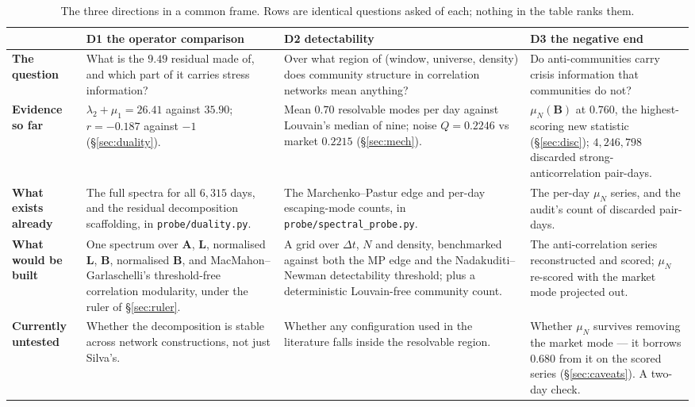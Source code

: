 \documentclass[11pt,a4paper]{article}
\newcommand{\Q}{Q}
\newcommand{\Lap}{\mathbf{L}}
\newcommand{\Amat}{\mathbf{A}}
\newcommand{\Bmat}{\mathbf{B}}
\begin{document}
\begin{table}[t]
\centering\small
\caption{The three directions in a common frame. Rows are identical questions
asked of each; nothing in the table ranks them.}
\label{tab:directions}
\renewcommand{\arraystretch}{1.12}
\begin{tabular}{@{}p{22mm}p{40mm}p{40mm}p{40mm}@{}}
\toprule
& \textbf{\textcolor{ModC}{D1}} the operator comparison
& \textbf{\textcolor{ModC}{D2}} detectability
& \textbf{\textcolor{ModC}{D3}} the negative end \\
\midrule

\textbf{The question}
& What is the $9.49$ residual made of, and which part of it carries stress
information?
& Over what region of (window, universe, density) does community structure in
correlation networks mean anything?
& Do anti-communities carry crisis information that communities do not? \\

\textbf{Evidence so far}
& $\lambda_2+\mu_1=26.41$ against $35.90$; $r=-0.187$ against $-1$
  (\S\ref{sec:duality}).
& Mean $0.70$ resolvable modes per day against Louvain's median of nine; noise
  $\Q=0.2246$ vs market $0.2215$ (\S\ref{sec:mech}).
& $\mu_N(\Bmat)$ at $0.760$, the highest-scoring new statistic
  (\S\ref{sec:disc}); $4{,}246{,}798$ discarded strong-anticorrelation
  pair-days. \\

\textbf{What exists already}
& The full spectra for all $6{,}315$ days, and the residual decomposition
  scaffolding, in \texttt{probe/duality.py}.
& The Marchenko--Pastur edge and per-day escaping-mode counts, in
  \texttt{probe/}\linebreak\texttt{spectral\_probe.py}.
& The per-day $\mu_N$ series, and the audit's count of discarded pair-days. \\

\textbf{What would be built}
& One spectrum over $\Amat$, $\Lap$, normalised $\Lap$, $\Bmat$, normalised
  $\Bmat$, and MacMahon--Garlaschelli's threshold-free correlation modularity,
  under the ruler of \S\ref{sec:ruler}.
& A grid over $\Delta t$, $N$ and density, benchmarked against both the MP edge
  and the Nadakuditi--Newman detectability threshold; plus a deterministic
  Louvain-free community count.
& The anti-correlation series reconstructed and scored; $\mu_N$ re-scored with
  the market mode projected out. \\

\textbf{Currently untested}
& Whether the decomposition is stable across network constructions, not just
  Silva's.
& Whether any configuration used in the literature falls inside the resolvable
  region.
& Whether $\mu_N$ survives removing the market mode --- it borrows $0.680$ from
  it on the scored series (\S\ref{sec:caveats}). A two-day check. \\


\end{tabular}
\end{table}
\end{document}
